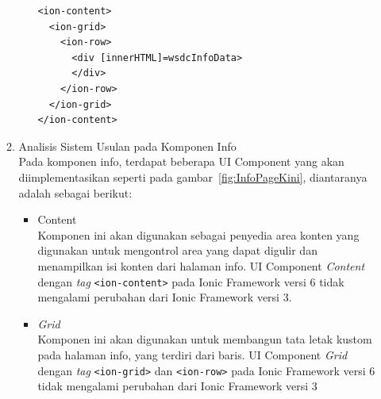 \begin{enumerate}
\begin{enumerate}
\begin{itemize}
\begin{lstlisting}[label={lst:contentInfo}, caption=\textit{Content} pada info.html]
<ion-content>
  <ion-grid>
    <ion-row>
      <div [innerHTML]=wsdcInfoData>
      </div>
    </ion-row>
  </ion-grid>
</ion-content>
\end{lstlisting} 
	\end{itemize}
		\item  Analisis Sistem Usulan pada Komponen Info \\
		Pada komponen info, terdapat beberapa UI Component yang akan diimplementasikan seperti pada gambar~\ref{fig:InfoPageKini}, diantaranya adalah sebagai berikut:
		\begin{itemize}
			\item Content \\
		Komponen ini akan digunakan sebagai penyedia area konten yang digunakan untuk mengontrol area yang dapat digulir dan menampilkan isi konten dari halaman info. UI Component \textit{Content} dengan \textit{tag} \texttt{<ion-content>} pada Ionic Framework versi 6 tidak mengalami perubahan dari Ionic Framework versi 3.
		
			\item \textit{Grid} \\
		Komponen ini akan digunakan untuk membangun tata letak kustom pada halaman info, yang terdiri dari baris. UI Component \textit{Grid} dengan \textit{tag} \texttt{<ion-grid>} dan \texttt{<ion-row>} pada Ionic Framework versi 6 tidak mengalami perubahan dari Ionic Framework versi 3
		\end{itemize}
	\end{enumerate}
	

\end{enumerate}
